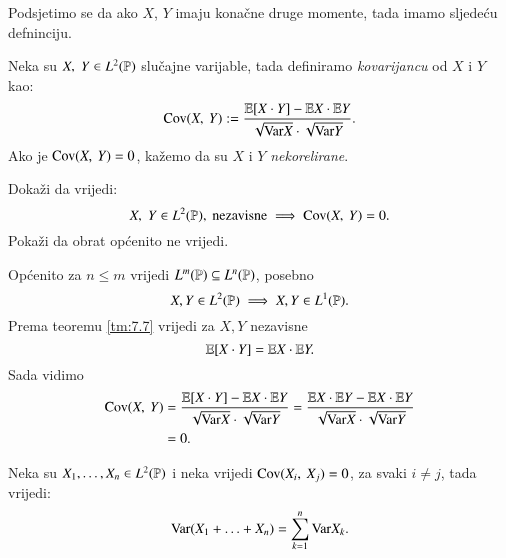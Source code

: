 Podsjetimo se da ako $X$, $Y$ imaju kona\v cne druge momente, tada imamo sljede\' cu defninciju.

\begin{defn}    \label{defn:12.1-1}
    Neka su $X, \; Y \in L^2(\mathbb{P})$ slu\v cajne varijable, tada definiramo \emph{kovarijancu} od $X$ i $Y$ kao:
    \begin{equation}    \label{jed:12.2}
        \mathrm{Cov} ({X}, \: {Y}) := \frac{\mathbb{E} [X \cdot Y] - \mathbb{E} X \cdot \mathbb{E} Y}{\sqrt{\mathrm{Var} X} \cdot \sqrt{\mathrm{Var} Y}}.
    \end{equation}
    Ako je $\mathrm{Cov} ({X}, \: {Y}) = 0$, ka\v zemo da su $X$ i $Y$ \emph{nekorelirane}.
\end{defn}

\begin{zad} \label{zad:12.3}
    Doka\v zi da vrijedi:
    \begin{equation*}
        X, \; Y \in L^2(\mathbb{P}), \textnormal{ nezavisne} \implies \mathrm{Cov} ({X}, \: {Y}) = 0.
    \end{equation*}
    Poka\v zi da obrat op\' cenito ne vrijedi.
\end{zad}

\begin{rj}[\ref{zad:12.3}]
    Op\' cenito za $n \leq m$ vrijedi $L^m (\mathbb{P}) \subseteq L^n (\mathbb{P})$, posebno
    \begin{equation*}
        X, Y \in L^2 (\mathbb{P}) \implies X, Y \in L^1 (\mathbb{P}).
    \end{equation*}
    Prema teoremu \ref{tm:7.7} vrijedi za $X, Y$ nezavisne
    \begin{equation*}
        \mathbb{E} [X \cdot Y] = \mathbb{E} X \cdot \mathbb{E} Y.
    \end{equation*}
    Sada vidimo
    \begin{equation*}
        \begin{aligned}
            \mathrm{Cov} ({X}, \: {Y}) &= \frac{\mathbb{E} [X \cdot Y] - \mathbb{E} X \cdot \mathbb{E} Y}{\sqrt{\mathrm{Var} X} \cdot \sqrt{\mathrm{Var} Y}} = \frac{\mathbb{E} X \cdot \mathbb{E} Y - \mathbb{E} X \cdot \mathbb{E} Y}{\sqrt{\mathrm{Var} X} \cdot \sqrt{\mathrm{Var} Y}}\\
            &= 0.
        \end{aligned}
    \end{equation*}
\end{rj}

\begin{zad} \label{zad:12.4}
    Neka su $X_1, \ldots, X_n \in L^2(\mathbb{P})$ i neka vrijedi $\mathrm{Cov} ({X_i}, \: {X_j}) = 0$, za svaki $i \neq j$, tada vrijedi:
    \begin{equation*}
        \mathrm{Var} (X_1 + \ldots + X_n) = \sum\limits_{k = 1}^{n} \mathrm{Var} X_k.
    \end{equation*}
\end{zad}

